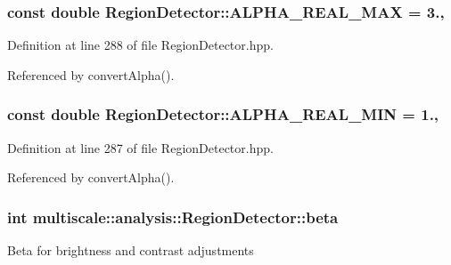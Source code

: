 \hypertarget{classmultiscale_1_1analysis_1_1RegionDetector_abc853d2cfef9e4fafbf86715b48495e0}{
\subsubsection[{A\-L\-P\-H\-A\-\_\-\-R\-E\-A\-L\-\_\-\-M\-A\-X}]{\setlength{\rightskip}{0pt plus 5cm}const double Region\-Detector\-::\-A\-L\-P\-H\-A\-\_\-\-R\-E\-A\-L\-\_\-\-M\-A\-X = 3.\hspace{0.3cm}{\ttfamily [static]}, {\ttfamily [private]}}}\label{classmultiscale_1_1analysis_1_1RegionDetector_abc853d2cfef9e4fafbf86715b48495e0}


Definition at line 288 of file Region\-Detector.\-hpp.



Referenced by convert\-Alpha().

\hypertarget{classmultiscale_1_1analysis_1_1RegionDetector_a4a11aa86a5250ca6197589c4ccb770f6}{
\subsubsection[{A\-L\-P\-H\-A\-\_\-\-R\-E\-A\-L\-\_\-\-M\-I\-N}]{\setlength{\rightskip}{0pt plus 5cm}const double Region\-Detector\-::\-A\-L\-P\-H\-A\-\_\-\-R\-E\-A\-L\-\_\-\-M\-I\-N = 1.\hspace{0.3cm}{\ttfamily [static]}, {\ttfamily [private]}}}\label{classmultiscale_1_1analysis_1_1RegionDetector_a4a11aa86a5250ca6197589c4ccb770f6}


Definition at line 287 of file Region\-Detector.\-hpp.



Referenced by convert\-Alpha().

\hypertarget{classmultiscale_1_1analysis_1_1RegionDetector_a23c831170c2264dd7e59067a1a7d3c8e}{
\subsubsection[{beta}]{\setlength{\rightskip}{0pt plus 5cm}int multiscale\-::analysis\-::\-Region\-Detector\-::beta\hspace{0.3cm}{\ttfamily [private]}}}\label{classmultiscale_1_1analysis_1_1RegionDetector_a23c831170c2264dd7e59067a1a7d3c8e}
Beta for brightness and contrast adjustments 

